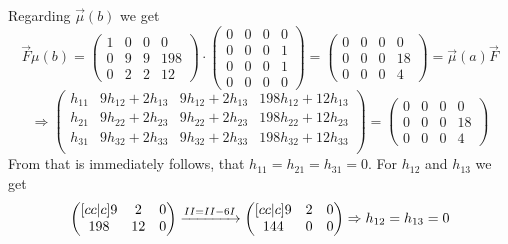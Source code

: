         Regarding $\overrightarrow{\mu}(b)$ we get
            \[ \overrightarrow{F} \mu(b) = 
            \begin{pmatrix}
                1 & 0 & 0 & 0 \\
                0 & 9 & 9 & 198 \\
                0 & 2 & 2 & 12 
            \end{pmatrix} \cdot \begin{pmatrix}
                    0 & 0 & 0 & 0 \\
                    0 & 0 & 0 & 1 \\
                    0 & 0 & 0 & 1 \\
                    0 & 0 & 0 & 0
            \end{pmatrix} = \begin{pmatrix}
                0 & 0 & 0 & 0 \\
                0 & 0 & 0 & 18 \\
                0 & 0 & 0 & 4
            \end{pmatrix}  = \overrightarrow{\mu}(a) \overrightarrow{F} 
        \] 
        \[\Rightarrow \begin{pmatrix}
                h_{11} & 9h_{12}+2h_{13} & 9h_{12}+2h_{13} & 198h_{12}+12h_{13} \\
                h_{21} & 9h_{22}+2h_{23} & 9h_{22}+2h_{23} & 198h_{22}+12h_{23} \\
                h_{31} & 9h_{32}+2h_{33} & 9h_{32}+2h_{33} & 198h_{32}+12h_{33} \\
            \end{pmatrix}  = 
            \begin{pmatrix}
                0 & 0 & 0 & 0 \\
                0 & 0 & 0 & 18 \\
                0 & 0 & 0 & 4
            \end{pmatrix}
        \]
        From that is immediately follows, that $h_{11} = h_{21} = h_{31} = 0$. For $h_{12}$ and $h_{13}$ we get 
        \[   \begin{pmatrix}[c c | c]
                9 & 2 & 0 \\
                198 & 12 & 0 \\
            \end{pmatrix} 
            \xrightarrow{\rom{2} = \rom{2} - 6\rom{1}} 
            \begin{pmatrix}[c c | c]
                9 & 2 & 0 \\
                144 & 0 & 0 \\
            \end{pmatrix} 
            \Rightarrow h_{12} = h_{13} = 0
        \]
